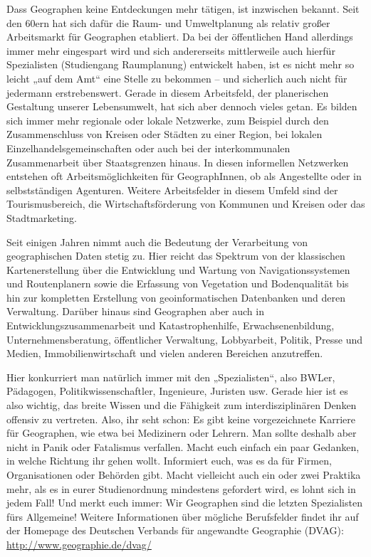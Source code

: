 Dass Geographen keine Entdeckungen mehr tätigen, ist inzwischen bekannt. Seit den 60ern hat sich dafür die Raum- und Umweltplanung als relativ großer Arbeitsmarkt für Geographen etabliert. Da bei der öffentlichen Hand allerdings immer mehr eingespart wird und sich andererseits mittlerweile auch hierfür Spezialisten (Studiengang Raumplanung) entwickelt haben, ist es nicht mehr so leicht „auf dem Amt“ eine Stelle zu bekommen – und sicherlich auch nicht für jedermann erstrebenswert. Gerade in diesem Arbeitsfeld, der planerischen Gestaltung unserer Lebensumwelt, hat sich aber dennoch vieles getan. Es bilden sich immer mehr regionale oder lokale Netzwerke, zum Beispiel durch den Zusammenschluss von Kreisen oder Städten zu einer Region, bei lokalen Einzelhandelsgemeinschaften oder auch bei der interkommunalen Zusammenarbeit über Staatsgrenzen hinaus. In diesen informellen Netzwerken entstehen oft Arbeitsmöglichkeiten für GeographInnen, ob als Angestellte oder in selbstständigen Agenturen. Weitere Arbeitsfelder in diesem Umfeld sind der Tourismusbereich, die Wirtschaftsförderung von Kommunen und Kreisen oder das Stadtmarketing.

Seit einigen Jahren nimmt auch die Bedeutung der Verarbeitung von geographischen Daten stetig zu. Hier reicht das Spektrum von der klassischen Kartenerstellung über die Entwicklung und Wartung von Navigationssystemen und Routenplanern sowie die Erfassung von Vegetation und Bodenqualität bis hin zur kompletten Erstellung von geoinformatischen Datenbanken und deren Verwaltung. Darüber hinaus sind Geographen aber auch in Entwicklungszusammenarbeit und Katastrophenhilfe, Erwachsenenbildung, Unternehmensberatung, öffentlicher Verwaltung, Lobbyarbeit, Politik, Presse und Medien, Immobilienwirtschaft und vielen anderen Bereichen anzutreffen.

Hier konkurriert man natürlich immer mit den „Spezialisten“, also BWLer, Pädagogen, Politikwissenschaftler, Ingenieure, Juristen usw. Gerade hier ist es also wichtig, das breite Wissen und die Fähigkeit zum interdisziplinären Denken offensiv zu vertreten. Also, ihr seht schon: Es gibt keine vorgezeichnete Karriere für Geographen, wie etwa bei Medizinern oder Lehrern. Man sollte deshalb aber nicht in Panik oder Fatalismus verfallen. Macht euch einfach ein paar Gedanken, in welche Richtung ihr gehen wollt. Informiert euch, was es da für Firmen, Organisationen oder Behörden gibt. Macht vielleicht auch ein oder zwei Praktika mehr, als es in eurer Studienordnung mindestens gefordert wird, es lohnt sich in jedem Fall! Und merkt euch immer: Wir Geographen sind die letzten Spezialisten fürs Allgemeine! Weitere Informationen über mögliche Berufsfelder ﬁndet ihr auf der Homepage des Deutschen Verbands für angewandte Geographie (DVAG): \url{http://www.geographie.de/dvag/}

